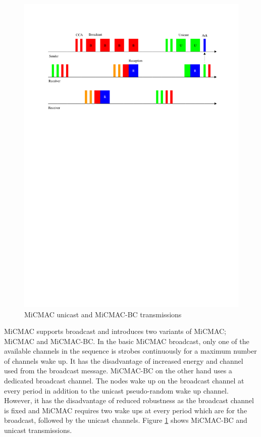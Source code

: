 \begin{figure}
\centering
\includegraphics[trim=2cm 19cm 1cm 2cm, clip=true, totalheight=0.30\textheight]{micmac.pdf}
\caption{MiCMAC unicast and MiCMAC-BC transmissions}
\label{fig_micmac}
\end{figure}

MiCMAC supports broadcast and introduces two variants of MiCMAC; MiCMAC and MiCMAC-BC. In the basic MiCMAC broadcast, only one of the available channels in the sequence is strobes continuously for a maximum number of channels wake up. It has the disadvantage of increased energy and channel used from the broadcast message. MiCMAC-BC on the other hand uses a dedicated broadcast channel. The nodes wake up on the broadcast channel at every period in addition to the unicast pseudo-random wake up channel. However, it has the disadvantage of reduced robustness as the broadcast channel is fixed and MiCMAC requires two wake ups at every period which are for the broadcast, followed by the unicast channels. Figure \ref{fig_micmac} shows MiCMAC-BC and unicast transmissions.

